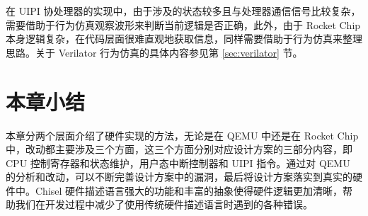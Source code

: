 在 UIPI 协处理器的实现中，由于涉及的状态较多且与处理器通信信号比较复杂，需要借助于行为仿真观察波形来判断当前逻辑是否正确，此外，由于 Rocket Chip 本身逻辑复杂，在代码层面很难直观地获取信息，同样需要借助于行为仿真来整理思路。关于 Verilator 行为仿真的具体内容参见第 \ref{sec:verilator} 节。

\section{本章小结}

本章分两个层面介绍了硬件实现的方法，无论是在 QEMU 中还是在 Rocket Chip 中，改动都主要涉及三个方面，这三个方面分别对应设计方案的三部分内容，即 CPU 控制寄存器和状态维护，用户态中断控制器和 UIPI 指令。通过对 QEMU 的分析和改动，可以不断完善设计方案中的漏洞，最后将设计方案落实到真实的硬件中。Chisel 硬件描述语言强大的功能和丰富的抽象使得硬件逻辑更加清晰，帮助我们在开发过程中减少了使用传统硬件描述语言时遇到的各种错误。